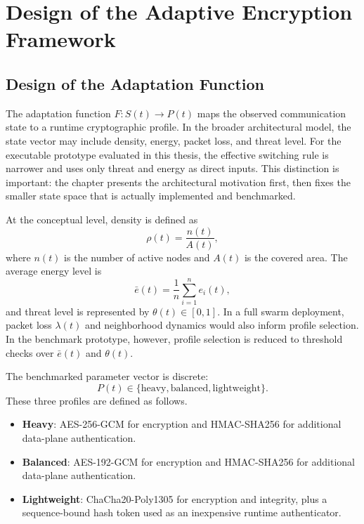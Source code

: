 \chapter{Design of the Adaptive Encryption Framework}
\label{chap:adaptive_framework}

\section{Design of the Adaptation Function}
\label{sec:adaptation_function}

The adaptation function $F: S(t) \rightarrow P(t)$ maps the observed communication state to a runtime cryptographic profile. In the broader architectural model, the state vector may include density, energy, packet loss, and threat level. For the executable prototype evaluated in this thesis, the effective switching rule is narrower and uses only threat and energy as direct inputs. This distinction is important: the chapter presents the architectural motivation first, then fixes the smaller state space that is actually implemented and benchmarked.

At the conceptual level, density is defined as
\begin{equation}
\rho(t) = \frac{n(t)}{A(t)},
\label{eq:density_time}
\end{equation}
where $n(t)$ is the number of active nodes and $A(t)$ is the covered area. The average energy level is
\begin{equation}
\bar{e}(t) = \frac{1}{n}\sum_{i=1}^{n} e_i(t),
\label{eq:avg_energy_time}
\end{equation}
and threat level is represented by $\theta(t) \in [0,1]$. In a full swarm deployment, packet loss $\lambda(t)$ and neighborhood dynamics would also inform profile selection. In the benchmark prototype, however, profile selection is reduced to threshold checks over $\bar{e}(t)$ and $\theta(t)$.

The benchmarked parameter vector is discrete:
\[
P(t) \in \{\text{heavy}, \text{balanced}, \text{lightweight}\}.
\]
These three profiles are defined as follows.
\begin{itemize}
  \item \textbf{Heavy}: AES-256-GCM for encryption and HMAC-SHA256 for additional data-plane authentication.
  \item \textbf{Balanced}: AES-192-GCM for encryption and HMAC-SHA256 for additional data-plane authentication.
  \item \textbf{Lightweight}: ChaCha20-Poly1305 for encryption and integrity, plus a sequence-bound hash token used as an inexpensive runtime authenticator.
\end{itemize}

